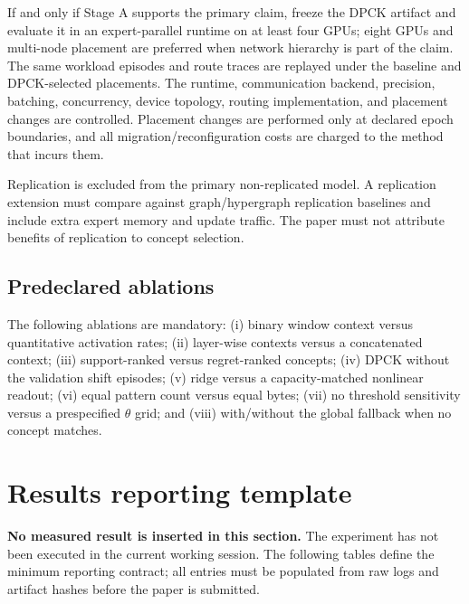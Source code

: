 \documentclass[a4paper,preprint,review,12pt,authoryear]{elsarticle}
\begin{document}
If and only if Stage A supports the primary claim, freeze the DPCK artifact and evaluate it in an expert-parallel runtime on at least four GPUs; eight GPUs and multi-node placement are preferred when network hierarchy is part of the claim. The same workload episodes and route traces are replayed under the baseline and DPCK-selected placements. The runtime, communication backend, precision, batching, concurrency, device topology, routing implementation, and placement changes are controlled. Placement changes are performed only at declared epoch boundaries, and all migration/reconfiguration costs are charged to the method that incurs them.

Replication is excluded from the primary non-replicated model. A replication extension must compare against graph/hypergraph replication baselines and include extra expert memory and update traffic. The paper must not attribute benefits of replication to concept selection.

\subsection{Predeclared ablations}

The following ablations are mandatory: (i) binary window context versus quantitative activation rates; (ii) layer-wise contexts versus a concatenated context; (iii) support-ranked versus regret-ranked concepts; (iv) DPCK without the validation shift episodes; (v) ridge versus a capacity-matched nonlinear readout; (vi) equal pattern count versus equal bytes; (vii) no threshold sensitivity versus a prespecified $\theta$ grid; and (viii) with/without the global fallback when no concept matches.

\section{Results reporting template}
\label{sec:results}

\textbf{No measured result is inserted in this section.} The experiment has not been executed in the current working session. The following tables define the minimum reporting contract; all entries must be populated from raw logs and artifact hashes before the paper is submitted.
\end{document}
